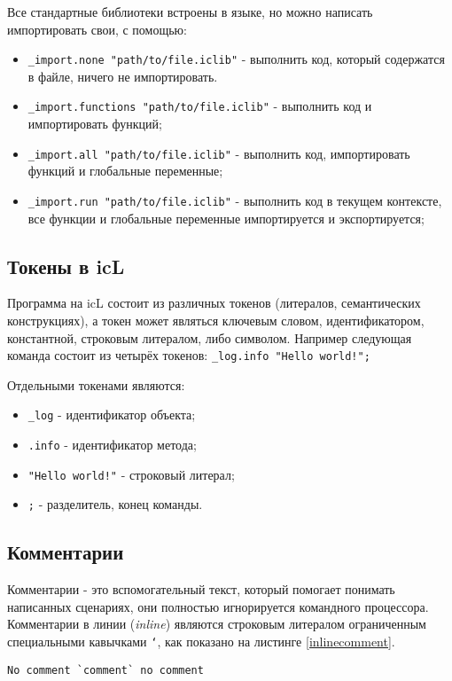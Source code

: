 \documentclass[a4paper, 14pt]{extarticle}
\newenvironment{icItems}
	{ \begin{itemize} [noitemsep,nolistsep] }
	{ \end{itemize} }
\begin{document}
	Все стандартные библиотеки встроены в языке, но можно написать импортировать свои, с помощью:
	\begin{icItems}
	\item \lstinline`_import.none "path/to/file.iclib"` - выполнить код, который содержатся в файле, ничего не импортировать.
	\item \lstinline`_import.functions "path/to/file.iclib"` - выполнить код и импортировать функций;
	\item \lstinline`_import.all "path/to/file.iclib"` -  выполнить код, импортировать функций и глобальные переменные;
	\item \lstinline`_import.run "path/to/file.iclib"` - выполнить код в текущем контексте, все функции и глобальные переменные импортируется и экспортируется;
	\end{icItems}
	
	\subsection{Токены в icL}
	
	Программа на icL состоит из различных токенов (литералов, семантических конструкциях), а токен может являться ключевым словом, идентификатором, константной, строковым литералом, либо символом. Например следующая команда состоит из четырёх токенов: \lstinline`_log.info "Hello world!";`
	
	Отдельными токенами являются:
	\begin{icItems}
	\item \lstinline`_log` - идентификатор объекта;
	\item \lstinline`.info` - идентификатор метода;
	\item \lstinline`"Hello world!"` - строковый литерал;
	\item \lstinline`;` - разделитель, конец команды.
	\end{icItems}
	
	\subsection{Комментарии}
	
	Комментарии - это вспомогательный текст, который помогает понимать написанных сценариях, они полностью игнорируется командного процессора. Комментарии в линии (\textit{inline}) являются строковым литералом ограниченным специальными кавычками \texttt{`}, как показано на листинге \ref{inlinecomment}.
	
	\begin{lstlisting}[caption=Комментарий в линии,label=inlinecomment]
No comment `comment` no comment
	\end{lstlisting}
	
\end{document}
